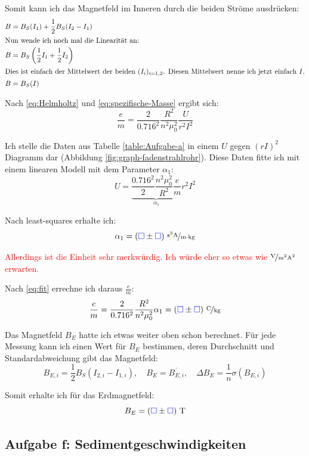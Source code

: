\documentclass[11pt, ngerman]{article}
\newcommand{\emesswert}{\left(\messwert \pm \messwert \right)}
\newcommand{\half}{\frac{1}{2}}
\newcommand{\messwert}{\textcolor{blue}{\square}}
\begin{document}
Somit kann ich das Magnetfeld im Inneren durch die beiden Ströme ausdrücken:
\begin{align*}
	B &= B_S(I_1) + \half B_S(I_2 - I_1) \\
	\intertext{Nun wende ich noch mal die Linearität an:}
	B &= B_S \left( \half I_1 + \half I_2 \right) \\
	\intertext{Dies ist einfach der Mittelwert der beiden $(I_i)_{i = 1,2}$.
	Diesen Mittelwert nenne ich jetzt einfach $I$.}
	B &= B_S(I)
\end{align*}

Nach \eqref{eq:Helmholtz} und \eqref{eq:spezifische-Masse} ergibt sich:
\begin{equation}
	\label{eq:fit}
	\frac em = \frac{2}{0.716^2} \frac{R^2}{n^2 \mu_0^2} \frac{U}{r^2 I^2}
\end{equation}

Ich stelle die Daten aus Tabelle \ref{table:Aufgabe-a} in einem $U$ gegen
$(rI)^2$ Diagramm dar (Abbildung \ref{fig:graph-fadenstrahlrohr}). Diese Daten
fitte ich mit einem linearen Modell mit dem Parameter $\alpha_1$:
\[ U = \underbrace{\frac{0.716^2}{2} \frac{n^2 \mu_0^2}{R^2} \frac em}_{\alpha_1} r^2 I^2 \]

Nach least-squares erhalte ich:
\[ \alpha_1 = \unitfrac[\emesswert]{s^3 A}{m \cdot kg} \]

\textcolor{red}{Allerdings ist die Einheit sehr merkwürdig. Ich würde eher so
etwas wie $\unitfrac{V}{m^2 A^2}$ erwarten.}

Nach \eqref{eq:fit} errechne ich daraus $\frac em$:
\begin{equation}
	\label{eq:em}
	\frac em
	= \frac{2}{0.716^2} \frac{R^2}{n^2 \mu_0^2} \alpha_1
	= \unitfrac[\emesswert] C{kg}
\end{equation}

Das Magnetfeld $B_E$ hatte ich etwas weiter oben schon berechnet. Für jede
Messung kann ich einen Wert für $B_E$ bestimmen, deren Durchschnitt und
Standardabweichung gibt das Magnetfeld:
\[
	B_{E,i} = \half B_S(I_{2,i} - I_{1,i})
	, \quad
	B_E = \overline{B_{E,i}}
	, \quad
	\Delta B_E = \frac 1n \sigma(B_{E,i})
\]

Somit erhalte ich für das Erdmagnetfeld:
\[ B_E = \unit[\emesswert] T \]

\subsection{Aufgabe f: Sedimentgeschwindigkeiten}

\label{Auswertung-f}
\end{document}

